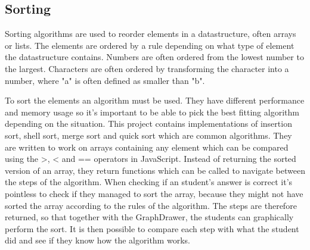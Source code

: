\subsection{Sorting}
Sorting algorithms are used to reorder elements in a datastructure, often arrays or lists. The elements are ordered by a rule depending on what type of element the datastructure contains. Numbers are often ordered from the lowest number to the largest. Characters are often ordered by transforming the character into a number, where "a" is often defined as smaller than "b".
\par
To sort the elements an algorithm must be used. They have different performance and memory usage so it's important to be able to pick the best fitting algorithm depending on the situation. This project contains implementations of insertion sort, shell sort, merge sort and quick sort which are common algorithms. They are written to work on arrays containing any element which can be compared using the >, < and == operators in JavaScript. Instead of returning the sorted version of an array, they return functions which can be called to navigate between the steps of the algorithm. When checking if an student's answer is correct it's pointless to check if they managed to sort the array, because they might not have sorted the array according to the rules of the algorithm. The steps are therefore returned, so that together with the GraphDrawer, the students can graphically perform the sort. It is then possible to compare each step with what the student did and see if they know how the algorithm works.








